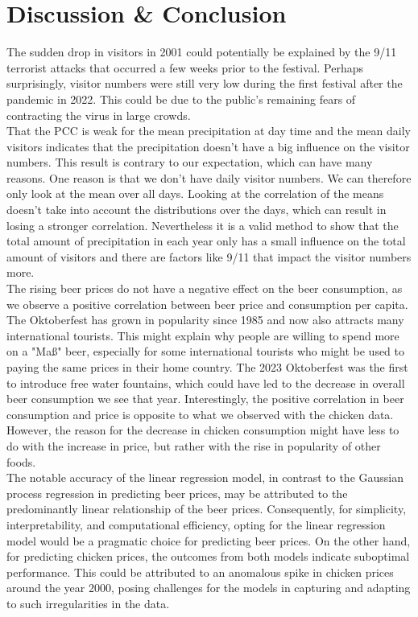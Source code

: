 \documentclass{article}
\theoremstyle{plain}
\theoremstyle{definition}
\theoremstyle{remark}
\begin{document}
\section{Discussion \& Conclusion}\label{sec:conclusion}
The sudden drop in visitors in 2001 could potentially be explained by the 9/11 terrorist attacks that occurred a few weeks prior to the festival. Perhaps surprisingly, visitor numbers were still very low during the first festival after the pandemic in 2022. This could be due to the public's remaining fears of contracting the virus in large crowds.\\
That the PCC is weak for the mean precipitation at day time and the mean daily visitors indicates that the precipitation doesn't have a big influence on the visitor numbers. This result is contrary to our expectation, which can have many reasons. One reason is that we don't have daily visitor numbers. We can therefore only look at the mean over all days. Looking at the correlation of the means doesn't take into account the distributions over the days, which can result in losing a stronger correlation. Nevertheless it is a valid method to show that the total amount of precipitation in each year only has a small influence on the total amount of visitors and there are factors like 9/11 that impact the visitor numbers more.\\
The rising beer prices do not have a negative effect on the beer consumption, as we observe a positive correlation between beer price and consumption per capita. The Oktoberfest has grown in popularity since 1985 and now also attracts many international tourists. This might explain why people are willing to spend more on a "Maß" beer, especially for some international tourists who might be used to paying the same prices in their home country. The 2023 Oktoberfest was the first to introduce free water fountains, which could have led to the decrease in overall beer consumption we see that year. Interestingly, the positive correlation in beer consumption and price is opposite to what we observed with the chicken data. However, the reason for the decrease in chicken consumption might have less to do with the increase in price, but rather with the rise in popularity of other foods.\\
The notable accuracy of the linear regression model, in contrast to the Gaussian process regression in predicting beer prices, may be attributed to the predominantly linear relationship of the beer prices. Consequently, for simplicity, interpretability, and computational efficiency, opting for the linear regression model would be a pragmatic choice for predicting beer prices. 
On the other hand, for predicting chicken prices, the outcomes from both models indicate suboptimal performance. This could be attributed to an anomalous spike in chicken prices around the year 2000, posing challenges for the models in capturing and adapting to such irregularities in the data.\\
\end{document}
